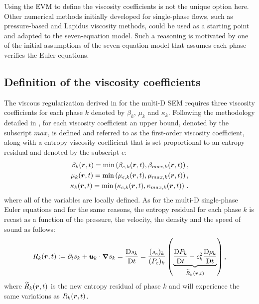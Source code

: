 Using the EVM to define the viscosity coefficients is not the unique option here. Other numerical methods initially developed for single-phase flows, such as pressure-based and Lapidus viscosity methods, could be used as a starting point and adapted to the seven-equation model. Such a reasoning is motivated by one of the initial assumptions of the seven-equation model that assumes each phase verifies the Euler equations.
\subsection{Definition of the viscosity coefficients}\label{sec:visc-coeff-sem}
The viscous regularization derived in  for the multi-D SEM requires three viscosity coefficients for each phase $k$ denoted by $\beta_k$, $\mu_k$ and $\kappa_k$. Following the methodology detailed in , for each viscosity coefficient an upper bound, denoted by the subscript $max$, is defined and referred to as the first-order viscosity coefficient, along with a entropy viscosity coefficient that is set proportional to an entropy residual and denoted by the subscript $e$:
%
\begin{align}\label{eq:def-visc-sem-sct4}
\beta_k( \boldsymbol r, t) = \min \left( \beta_{e,k}( \boldsymbol r, t), \beta_{max,k} ( \boldsymbol r, t) \right), \nonumber \\
\mu_k( \boldsymbol r, t) = \min \left( \mu_{e,k}( \boldsymbol r, t), \mu_{max,k} ( \boldsymbol r, t) \right), \nonumber \\
\kappa_k( \boldsymbol r, t) = \min \left( \kappa_{e,k}( \boldsymbol r, t), \kappa_{max,k} ( \boldsymbol r, t) \right) \,. \nonumber
\end{align}
% 
where all of the variables are locally defined. As for the multi-D single-phase Euler equations and for the same reasons, the entropy residual for each phase $k$ is recast as a function of the pressure, the velocity, the density and the speed of sound as follows:
%
\begin{equation}\label{eq:ent_res-sem-sct4}
R_k(\boldsymbol r,t) := \partial_t s_k + \boldsymbol u_k \cdot \boldsymbol{\nabla} s_k = \frac{\textrm{D} s_k}{\textrm{D} t} = \frac{(s_e)_k}{(P_e)_k} \left( \underbrace{\frac{\textrm{D} P_k}{\textrm{D} t} - c_k^2 \frac{\textrm{D} \rho_k}{\textrm{D} t} }_{\widetilde{R}_k(\boldsymbol r,t)} \right) ,
\end{equation} 
%
where $\widetilde{R}_k(\boldsymbol r,t)$ is the new entropy residual of phase $k$ and will experience the same variations as $R_k(\boldsymbol r,t)$. 

